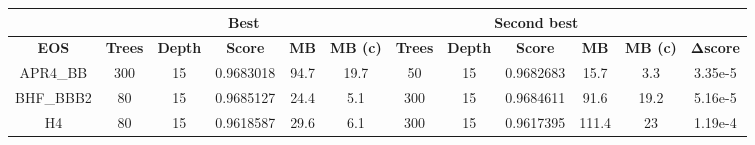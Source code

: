\begin{table}[]
\centering
\begin{tabular}{@{}cccccccccccc@{}}
\toprule
\multicolumn{1}{l}{}               & \multicolumn{5}{c}{Best}                                                                                                                                                                  & \multicolumn{5}{c}{Second best}                                                                                                                                                           & \multicolumn{1}{l}{}                 \\ \midrule
\multicolumn{1}{|c|}{\textbf{EOS}} & \multicolumn{1}{c|}{\textbf{Trees}} & \multicolumn{1}{c|}{\textbf{Depth}} & \multicolumn{1}{c|}{\textbf{Score}} & \multicolumn{1}{c|}{\textbf{MB}} & \multicolumn{1}{c|}{\textbf{MB (c)}} & \multicolumn{1}{c|}{\textbf{Trees}} & \multicolumn{1}{c|}{\textbf{Depth}} & \multicolumn{1}{c|}{\textbf{Score}} & \multicolumn{1}{c|}{\textbf{MB}} & \multicolumn{1}{c|}{\textbf{MB (c)}} & \multicolumn{1}{c|}{\textbf{Δscore}} \\ \midrule
\multicolumn{1}{|c|}{APR4\_BB}     & \multicolumn{1}{c|}{300}            & \multicolumn{1}{c|}{15}             & \multicolumn{1}{c|}{0.9683018}      & \multicolumn{1}{c|}{94.7}        & \multicolumn{1}{c|}{19.7}            & \multicolumn{1}{c|}{50}             & \multicolumn{1}{c|}{15}             & \multicolumn{1}{c|}{0.9682683}      & \multicolumn{1}{c|}{15.7}        & \multicolumn{1}{c|}{3.3}             & \multicolumn{1}{c|}{3.35e-5}         \\ \midrule
\multicolumn{1}{|c|}{BHF\_BBB2}    & \multicolumn{1}{c|}{80}             & \multicolumn{1}{c|}{15}             & \multicolumn{1}{c|}{0.9685127}      & \multicolumn{1}{c|}{24.4}        & \multicolumn{1}{c|}{5.1}             & \multicolumn{1}{c|}{300}            & \multicolumn{1}{c|}{15}             & \multicolumn{1}{c|}{0.9684611}      & \multicolumn{1}{c|}{91.6}        & \multicolumn{1}{c|}{19.2}            & \multicolumn{1}{c|}{5.16e-5}         \\ \midrule
\multicolumn{1}{|c|}{H4}           & \multicolumn{1}{c|}{80}             & \multicolumn{1}{c|}{15}             & \multicolumn{1}{c|}{0.9618587}      & \multicolumn{1}{c|}{29.6}        & \multicolumn{1}{c|}{6.1}             & \multicolumn{1}{c|}{300}            & \multicolumn{1}{c|}{15}             & \multicolumn{1}{c|}{0.9617395}      & \multicolumn{1}{c|}{111.4}       & \multicolumn{1}{c|}{23}              & \multicolumn{1}{c|}{1.19e-4}         \\ \midrule

\end{tabular}
\end{table}
